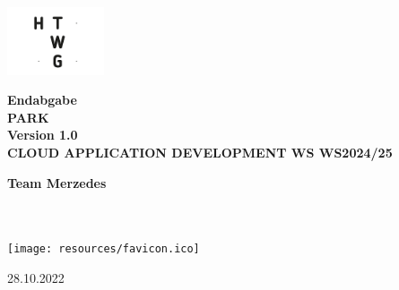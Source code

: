 \begin{titlepage}
    \begin{center}
        \vspace{0.5cm}
        
        \includegraphics[height=2cm]{resources/htwg-logo.png}
        
        \vspace{1.5cm}

        \Huge{\textbf{Endabgabe\\}}
        \vspace{0.5cm}
        \Huge{\textbf{PARK \\ Version 1.0 \\}}
        \vspace{0.5cm}
        \Huge{\textbf{CLOUD APPLICATION DEVELOPMENT WS WS2024/25}}
    
        \vspace{1.5cm}
 
        \Large{
            \textbf{Team Merzedes} \\
            \authorjonas \\
            \authorlukasb \\
            \authorlukase
        }
 
        \vspace{1.5cm}
        
        \texttt{[image: resources/favicon.ico]}

        \vspace{1.5cm}

        \large{28.10.2022}
      
    \end{center}
 \end{titlepage}

\newpage
